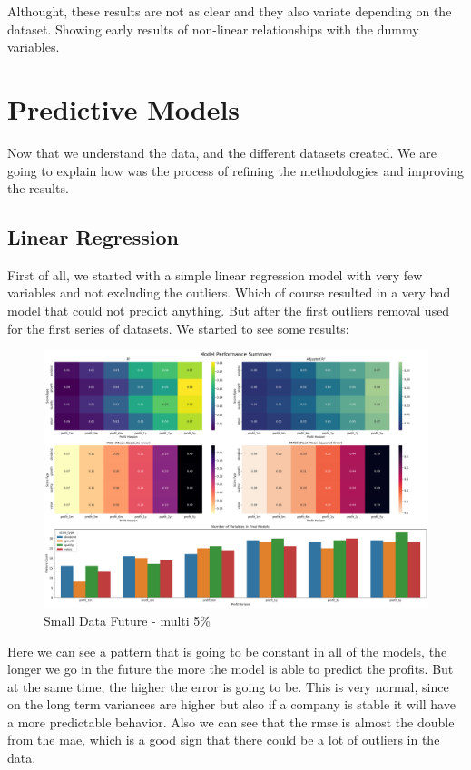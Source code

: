 \documentclass[11pt,english,a4paper,hidelinks]{book}
\begin{document}
\noindent Althought, these results are not as clear and they also variate depending on the dataset. Showing early results of non-linear relationships with the dummy variables.

\section{Predictive Models}

Now that we understand the data, and the different datasets created. We are going to explain how was the process of refining the methodologies and improving the results.

\subsection{Linear Regression}

First of all, we started with a simple linear regression model with very few variables and not excluding the outliers. Which of course resulted in a very bad model that could not predict anything. But after the first outliers removal used for the first series of datasets. We started to see some results:

\begin{figure}[H]
    \centering
    \includegraphics[width=1\textwidth]{images/code/models/linear_regression/first_model/regression_performance_summary.png}
    \caption{Small Data Future - \acrshort{multi} 5\%}
    \label{fig:first_linear_regression}
\end{figure}

\noindent Here we can see a pattern that is going to be constant in all of the models, the longer we go in the future the more the model is able to predict the profits. But at the same time, the higher the error is going to be. This is very normal, since on the long term variances are higher but also if a company is stable it will have a more predictable behavior. Also we can see that the \acrshort{rmse} is almost the double from the \acrshort{mae}, which is a good sign that there could be a lot of outliers in the data. 
\end{document}
